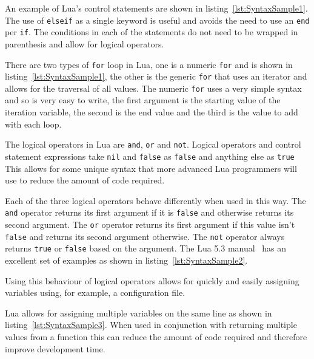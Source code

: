 \documentclass[11pt,a4paper,titlepage]{article}
\begin{document}
			An example of Lua's control statements are shown in listing~\ref{lst:SyntaxSample1}. The use of \texttt{elseif} as a single keyword is useful and avoids the need to use an \texttt{end} per \texttt{if}. The conditions in each of the statements do not need to be wrapped in parenthesis and allow for logical operators. 

			

			There are two types of \texttt{for} loop in Lua, one is a numeric \texttt{for} and is shown in listing~\ref{lst:SyntaxSample1}, the other is the generic \texttt{for} that uses an iterator and allows for the traversal of all values. The numeric \texttt{for} uses a very simple syntax and so is very easy to write, the first argument is the starting value of the iteration variable, the second is the end value and the third is the value to add with each loop.

			The logical operators in Lua are \texttt{and}, \texttt{or} and \texttt{not}. Logical operators and control statement expressions take \texttt{nil} and \texttt{false} as \texttt{false} and anything else as \texttt{true}~\cite{LuaMan} This allows for some unique syntax that more advanced Lua programmers will use to reduce the amount of code required.

			Each of the three logical operators behave differently when used in this way. The \texttt{and} operator returns its first argument if it is \texttt{false} and otherwise returns its second argument. The \texttt{or} operator returns its first argument if this value isn't \texttt{false} and returns its second argument otherwise. The \texttt{not} operator always returns \texttt{true} or \texttt{false} based on the argument. The Lua 5.3 manual~\cite{LuaMan} has an excellent set of examples as shown in listing~\ref{lst:SyntaxSample2}.
			

			Using this behaviour of logical operators allows for quickly and easily assigning variables using, for example, a configuration file.

			Lua allows for assigning multiple variables on the same line as shown in listing~\ref{lst:SyntaxSample3}. When used in conjunction with returning multiple values from a function this can reduce the amount of code required and therefore improve development time.
			 
\end{document}
